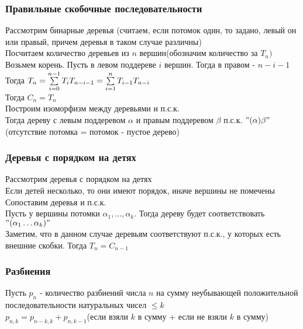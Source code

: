 \documentclass[12pt]{article}
\begin{document}
\subsubsection{Правильные скобочные последовательности}
Рассмотрим бинарные деревья (считаем, если потомок один, то задано, левый он или правый, причем деревья в таком случае различны)\\
Посчитаем количество деревьев из $n$ вершин(обозначим количество за $T_n)$\\
Возьмем корень. Пусть в левом поддереве $i$ вершин. Тогда в правом - $n-i-1$\\
Тогда $T_n = \sum\limits_{i=0}^{n-1}T_iT_{n-i-1} = \sum\limits_{i=1}^{n}T_{i-1}T_{n-i}$\\
Тогда $C_n = T_n$\\
Построим изоморфизм между деревьями и п.с.к.\\
Тогда дереву с левым поддеревом $\alpha$ и правым поддеревом $\beta$ п.с.к. $"(\alpha)\beta"$(отсутствие потомка = потомок - пустое дерево)
\subsubsection{Деревья с порядком на детях}
Рассмотрим деревья с порядком на детях\\
Если детей несколько, то они имеют порядок, иначе вершины не помечены\\
Сопоставим деревья и п.с.к.\\
Пусть у вершины потомки $\alpha_1, \ldots, \alpha_k$. Тогда дереву будет соответствовать $"(\alpha_1\ldots\alpha_k)"$\\
Заметим, что в данном случае деревьям соответствуют п.с.к., у которых есть внешние скобки. Тогда $T_n = C_{n-1}$\\
\subsubsection{Разбиения}
Пусть $p_n$ - количество разбиений числа $n$ на сумму неубывающей положительной последовательности натуральных чисел $\leq k$\\
$p_{n,k} = p_{n-k,k}+p_{n,k-1}$(если взяли $k$ в сумму + если не взяли $k$ в сумму)
\end{document}
